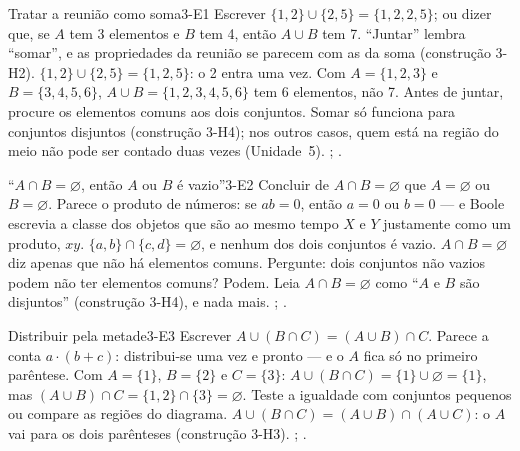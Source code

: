 \ErrosComuns

\begin{erro}{Tratar a reunião como soma}{3-E1}
 Escrever $\{1,2\}\cup\{2,5\}=\{1,2,2,5\}$; ou dizer que, se $A$ tem 3 elementos e $B$ tem 4, então $A\cup B$ tem 7.
 \enquote{Juntar} lembra \enquote{somar}, e as propriedades da reunião se parecem com as da soma (construção 3-H2).
 $\{1,2\}\cup\{2,5\}=\{1,2,5\}$: o 2 entra uma vez. Com $A=\{1,2,3\}$ e $B=\{3,4,5,6\}$, $A\cup B=\{1,2,3,4,5,6\}$ tem 6 elementos, não 7.
 Antes de juntar, procure os elementos comuns aos dois conjuntos.
 Somar só funciona para conjuntos disjuntos (construção 3-H4); nos outros casos, quem está na região do meio não pode ser contado duas vezes (Unidade~5).
 ; .
\end{erro}

\begin{erro}{\enquote{$A\cap B=\varnothing$, então $A$ ou $B$ é vazio}}{3-E2}
 Concluir de $A\cap B=\varnothing$ que $A=\varnothing$ ou $B=\varnothing$.
 Parece o produto de números: se $ab=0$, então $a=0$ ou $b=0$ — e Boole escrevia a classe dos objetos que são ao mesmo tempo $X$ e $Y$ justamente como um produto, $xy$.
 $\{a,b\}\cap\{c,d\}=\varnothing$, e nenhum dos dois conjuntos é vazio.
 $A\cap B=\varnothing$ diz apenas que não há elementos comuns. Pergunte: dois conjuntos não vazios podem não ter elementos comuns? Podem.
 Leia $A\cap B=\varnothing$ como \enquote{$A$ e $B$ são disjuntos} (construção 3-H4), e nada mais.
 ; .
\end{erro}

\begin{erro}{Distribuir pela metade}{3-E3}
 Escrever $A\cup(B\cap C)=(A\cup B)\cap C$.
 Parece a conta $a\cdot(b+c)$: distribui-se uma vez e pronto — e o $A$ fica só no primeiro parêntese.
 Com $A=\{1\}$, $B=\{2\}$ e $C=\{3\}$: $A\cup(B\cap C)=\{1\}\cup\varnothing=\{1\}$, mas $(A\cup B)\cap C=\{1,2\}\cap\{3\}=\varnothing$.
 Teste a igualdade com conjuntos pequenos ou compare as regiões do diagrama.
 $A\cup(B\cap C)=(A\cup B)\cap(A\cup C)$: o $A$ vai para os dois parênteses (construção 3-H3).
 ; .
\end{erro}

